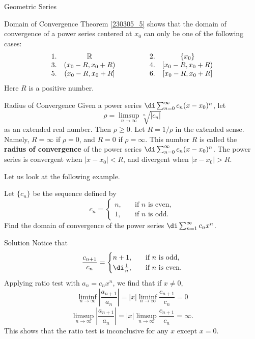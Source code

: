 \begin{example}[label=230305_16]{Geometric Series}
\begin{example}[label=230304_9]{}
\begin{highlight}{Domain of Convergence}
Theorem \ref{230305_5} shows that the domain of convergence of a power series centered at $x_0$ can only be one of the following cases:
\[\begin{array}{ccp{1cm}cc} 1.&\mathbb{R}  && 2.&
   \{x_0\} \\
   3.&(x_0-R,x_0+R)  &&4.&
   [x_0-R, x_0+R) \\
5.&   (x_0-R, x_0+R]  &&6.&
   [x_0-R, x_0+R] 
\end{array}\]Here $R$ is a positive number.
\end{highlight}
\begin{definition}{Radius of Convergence}
Given a power series $\di\sum_{n=0}^{\infty}c_n(x-x_0)^n$, let
\[\rho=\limsup_{n\to\infty}\sqrt[n]{|c_n|}\]as an extended real number. Then $\rho\geq 0$. Let $R=1/\rho$  in the extended sense. Namely, $R=\infty$ if $\rho=0$, and $R=0$ if $\rho=\infty$. 
This  number $R$ is called the {\bf radius of convergence} of the power series $\di\sum_{n=0}^{\infty}c_n(x-x_0)^n$. The power series is convergent when $|x-x_0|<R$, and divergent when $|x-x_0|>R$. 

\end{definition}

Let us look at the following example.
\begin{example}{}
Let $\{c_n\}$ be the sequence defined by
\[c_n=\begin{cases}n,\quad &\text{if $n$ is even},\\1,\quad  &\text{if $n$ is odd}.\end{cases}\]
Find the domain of convergence of the power series
$\di\sum_{n=1}^{\infty}c_nx^n$.
\end{example}
\begin{solution}{Solution}
Notice that 
\[\frac{c_{n+1}}{c_n}=\begin{cases} n+1,\quad  &\text{if $n$ is odd},\\\di \frac{1}{n},\quad  &\text{if $n$ is even}.\end{cases}\]Applying ratio test with
$a_n=c_nx^n$, we find that if $x\neq 0$,
\[\liminf_{n\to\infty}\left|\frac{a_{n+1}}{a_n}\right| =|x|\liminf_{n\to\infty}\frac{c_{n+1}}{c_n}=0\] \[
\limsup_{n\to\infty}\left|\frac{a_{n+1}}{a_n}\right| =|
x|\limsup_{n\to\infty}\frac{c_{n+1}}{c_n}=\infty.\]
This shows that the ratio test is inconclusive for any $x$ except $x=0$.


\end{solution}
\end{example}
\end{example}
